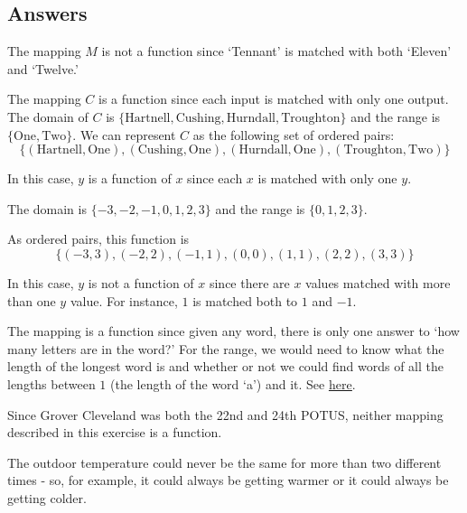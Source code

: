 \clearpage

\subsection{Answers}

\startexenum

\begin{exenum}

\item  The mapping $M$ is not a function since  `Tennant' is matched with both `Eleven' and `Twelve.'

\item  The mapping $C$ is a function since each input is matched with only one output.  The domain of $C$ is $\{ \text{Hartnell}, \text{Cushing}, \text{Hurndall}, \text{Troughton} \}$ and the range is $\{\text{One}, \text{Two} \}$.  We can represent $C$ as the following set of ordered pairs:
\[
      \{ (\text{Hartnell}, \text{One}), (\text{Cushing}, \text{One}),  (\text{Hurndall}, \text{One}), (\text{Troughton}, \text{Two}) \}
\]

\item  In this case, $y$ is a function of $x$ since each $x$ is matched with only one $y$.  

The domain is $\{ -3, -2, -1,0,1,2,3 \}$ and the range is $\{ 0,1,2,3 \}$.  

As ordered pairs, this function is
\[
\{ (-3,3), (-2,2), (-1,1), (0,0), (1,1), (2,2), (3,3) \}
\]

\item  In this case, $y$ is not a function of $x$ since there are $x$ values matched with more than one $y$ value.  For instance, $1$ is matched both to $1$ and $-1$.

\item    The mapping is a function since given any word, there is only one answer to `how many letters are in the word?'  For the range, we would need to know what the length of the longest word is and whether or not we could find words of all the lengths between $1$ (the length of the word `a') and it.  See \href{https://en.wikipedia.org/wiki/Longest_word_in_English}{\underline{here}}.

\item  Since Grover Cleveland was both the 22nd and 24th POTUS, neither mapping described in this exercise is a function.

\item  The outdoor temperature could never be the same for more than two different times - so, for example, it could always be getting warmer or it could always be getting colder.


\end{exenum}
